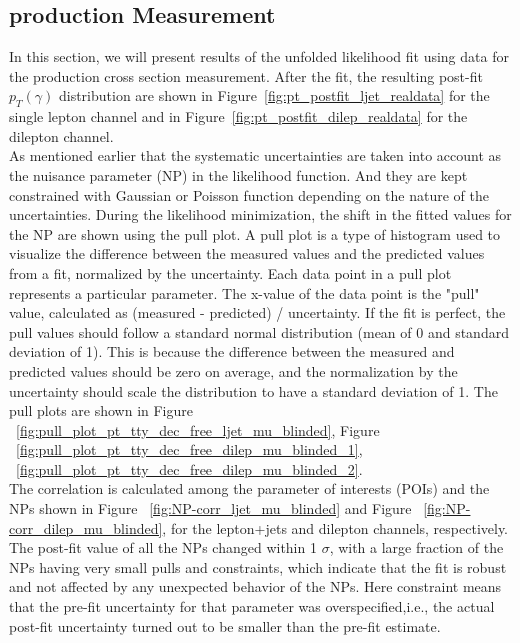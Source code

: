 \subsection{\tty production Measurement}
\label{sec:tty_prod_measurement}

In this section, we will present results of the unfolded likelihood fit using data for the \tty production cross section measurement. After the fit, the resulting post-fit $p_T(\gamma)$ distribution are shown in Figure~\ref{fig:pt_postfit_ljet_realdata} for the single lepton channel and in Figure~\ref{fig:pt_postfit_dilep_realdata} for the dilepton channel. 
\\
As mentioned earlier that the systematic uncertainties are taken into account as the nuisance parameter (NP) in the likelihood function. And they are kept constrained with Gaussian or Poisson function depending on the nature of the uncertainties.
During the likelihood minimization, the shift in the fitted values for the NP are shown using the pull plot. A pull plot is a type of histogram used to visualize the difference between the measured values and the predicted values from a fit, normalized by the uncertainty. Each data point in a pull plot represents a particular parameter. The x-value of the data point is the "pull" value, calculated as (measured - predicted) / uncertainty. If the fit is perfect, the pull values should follow a standard normal distribution (mean of 0 and standard deviation of 1). This is because the difference between the measured and predicted values should be zero on average, and the normalization by the uncertainty should scale the distribution to have a standard deviation of 1. The pull plots are shown in Figure ~\ref{fig:pull_plot_pt_tty_dec_free_ljet_mu_blinded}, Figure ~\ref{fig:pull_plot_pt_tty_dec_free_dilep_mu_blinded_1}, ~\ref{fig:pull_plot_pt_tty_dec_free_dilep_mu_blinded_2}. 
\\

The correlation is calculated among the parameter of interests (POIs) and the NPs shown in Figure ~\ref{fig:NP-corr_ljet_mu_blinded} and Figure ~\ref{fig:NP-corr_dilep_mu_blinded}, for the lepton+jets and dilepton channels, respectively. The post-fit value of all the NPs changed within 1 $\sigma$, with a large fraction of the NPs having very small pulls and constraints, which indicate that the fit is robust and not affected by any unexpected behavior of the NPs. Here constraint means that the pre-fit uncertainty for that parameter was overspecified,i.e., the actual post-fit uncertainty turned out to be smaller than the pre-fit estimate. \\

